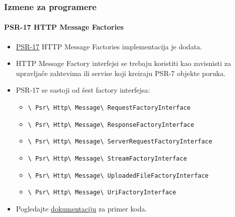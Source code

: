 
\begin{frame}[fragile]
	\frametitle{Izmene za programere}
	\framesubtitle{PSR-17 HTTP Message Factories}

	\begin{itemize}
		\item \href{https://www.php-fig.org/psr/psr-17/}{PSR-17}
			HTTP Message Factories implementacija je dodata.
		\item HTTP Message Factory interfejsi se trebaju koristiti kao zavisnisti
		 	za upravljače zahtevima ili servise koji kreiraju PSR-7 objekte poruka.
		\item PSR-17 se sastoji od šest factory interfejsa:

			\begin{itemize}\smaller
				\item \texttt{\textbackslash
					Psr\textbackslash
					Http\textbackslash
					Message\textbackslash
					RequestFactoryInterface}
				\item \texttt{\textbackslash
					Psr\textbackslash
					Http\textbackslash
					Message\textbackslash
					ResponseFactoryInterface}
				\item \texttt{\textbackslash
					Psr\textbackslash
					Http\textbackslash
					Message\textbackslash
					ServerRequestFactoryInterface}
				\item \texttt{\textbackslash
					Psr\textbackslash
					Http\textbackslash
					Message\textbackslash
					StreamFactoryInterface}
				\item \texttt{\textbackslash
					Psr\textbackslash
					Http\textbackslash
					Message\textbackslash
					UploadedFileFactoryInterface}
				\item \texttt{\textbackslash
					Psr\textbackslash
					Http\textbackslash
					Message\textbackslash
					UriFactoryInterface}

			\end{itemize}\normalsize

		\item Pogledajte
			\href{https://docs.typo3.org/c/typo3/cms-core/master/en-us/Changelog/10.1/Feature-89018-ProvideImplementationForPSR-17HTTPMessageFactories.html}{dokumentaciju}
			za primer koda.

	\end{itemize}

\end{frame}

